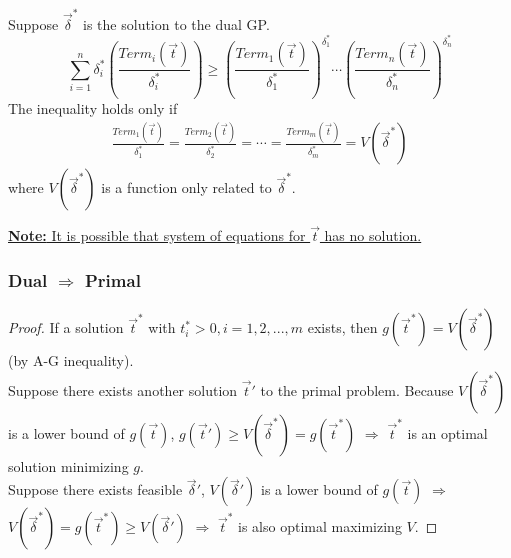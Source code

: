 \documentclass[11pt,a4paper]{article}
\newtheorem{theorem}{Theorem}
\begin{document}
Suppose $\vec{\delta}^*$ is the solution to the dual GP. $$\sum_{i=1}^n\delta^*_i\left(\frac{{Term}_i(\vec{t})}{\delta^*_i}\right)\geq \left(\frac{{Term}_1(\vec{t})}{\delta^*_1}\right)^{\delta^*_1}\cdots \left(\frac{{Term}_n(\vec{t})}{\delta^*_n}\right)^{\delta^*_n}$$
The inequality holds only if
\begin{equation}
    \begin{aligned}
        \frac{{Term}_1(\vec{t})}{\delta^*_1}=\frac{{Term}_2(\vec{t})}{\delta^*_2}=\cdots=\frac{{Term}_m(\vec{t})}{\delta^*_m}=V(\vec{\delta}^*)
    \end{aligned}
    \nonumber
\end{equation}
where $V(\vec{\delta}^*)$ is a function only related to $\vec{\delta}^*$.

\underline{\textbf{Note:} It is possible that system of equations for $\vec{t}$ has no solution.}

\subsubsection*{Dual $\Rightarrow$ Primal}
\begin{center}
\end{center}
\begin{proof}
    If a solution $\vec{t}^*$ with $t^*_i>0,i=1,2,...,m$ exists, then $g(\vec{t}^*)=V(\vec{\delta}^*)$ (by A-G inequality).\\
    Suppose there exists another solution $\vec{t}'$ to the primal problem. Because $V(\vec{\delta}^*)$ is a lower bound of $g(\vec{t})$, $g(\vec{t}')\geq V(\vec{\delta}^*)=g(\vec{t}^*)$ $\Rightarrow$ $\vec{t}^*$ is an optimal solution minimizing $g$.\\
    Suppose there exists feasible $\vec{\delta}'$, $V(\vec{\delta}')$ is a lower bound of $g(\vec{t})$ $\Rightarrow$ $V(\vec{\delta}^*)=g(\vec{t}^*)\geq V(\vec{\delta}')$ $\Rightarrow$ $\vec{t}^*$ is also optimal maximizing $V$.
\end{proof}
\end{document}
